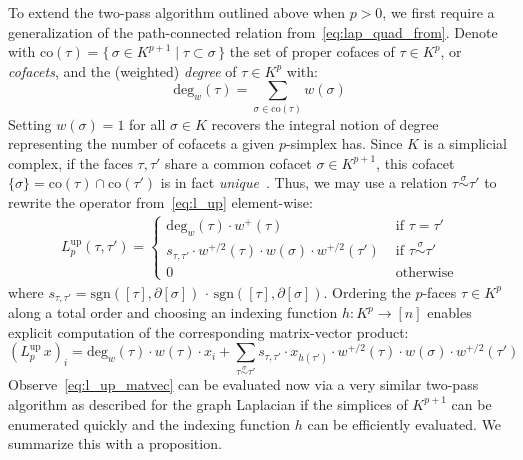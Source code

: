 \documentclass[10pt]{article}
\numberwithin{equation}{section}
\newcommand{\+}{%
	\raisebox{0.18ex}{\scaleobj{0.55}{+}}
}
\theoremstyle{definition}
\theoremstyle{definition}
\begin{document}
To extend the two-pass algorithm outlined above when $p > 0$, we first require a generalization of the path-connected relation from~\eqref{eq:lap_quad_from}.
 Denote with $\mathrm{co}(\tau) = \{ \, \sigma \in K^{p+1} \mid \tau \subset \sigma \, \}$ the set of proper cofaces of $\tau \in K^p$, or \emph{cofacets}, and the (weighted) \emph{degree} of $\tau \in K^p$ with: 
$$\mathrm{deg}_w(\tau) = \sum_{\sigma \in \mathrm{co}(\tau)} w(\sigma) $$
Setting $w(\sigma) = 1$ for all $\sigma \in K$ recovers the integral notion of degree representing the number of cofacets a given $p$-simplex has. 
Since $K$ is a simplicial complex, if the faces $\tau, \tau'$ share a common cofacet $\sigma \in K^{p+1}$, this cofacet $\{\sigma\} = \mathrm{co}(\tau) \cap \mathrm{co}(\tau')$ is in fact \emph{unique}~\cite{goldberg2002combinatorial}. 
Thus, we may use a relation $\tau \overset{\sigma}{\sim} \tau'$ to rewrite the operator from~\eqref{eq:l_up} element-wise: 
\begin{align}\label{eq:up_laplace_theory}
	 L_p^{\text{up}}(\tau, \tau')= \begin{cases}
		 \mathrm{deg}_w(\tau) \cdot w^{+}(\tau) & \text{ if } \tau = \tau' \\ 
		s_{\tau, \tau'} \cdot  w^{+/2}(\tau) \cdot w(\sigma) \cdot w^{+/2}(\tau') & \text{ if } \tau \overset{\sigma}{\sim} \tau' \\
		0 & \text{ otherwise} 
	\end{cases}
\end{align}
where $s_{\tau, \tau'} = \mathrm{sgn}([\tau], \partial[\sigma]) \, \cdot \, \mathrm{sgn}([\tau], \partial[\sigma])$. Ordering the $p$-faces $\tau \in K^p$ along a total order and choosing an indexing function $h : K^p \to [n]$ enables explicit computation of the corresponding matrix-vector product: 
\begin{equation}\label{eq:l_up_matvec}
	(L_p^{\textrm{up}} \, x)_i =  \mathrm{deg}_w(\tau) \cdot w(\tau) \cdot x_i + \sum\limits_{\tau \overset{\sigma}{\sim} \tau'} s_{\tau, \tau'} \cdot x_{h(\tau')} \cdot  w^{+/2}(\tau) \cdot w(\sigma) \cdot w^{+/2}(\tau') 
\end{equation}
Observe~\eqref{eq:l_up_matvec} can be evaluated now via a very similar two-pass algorithm as described for the graph Laplacian if the simplices of $K^{p+1}$ can be enumerated quickly and the indexing function $h$ can be efficiently evaluated. We summarize this with a proposition. 
\end{document}
